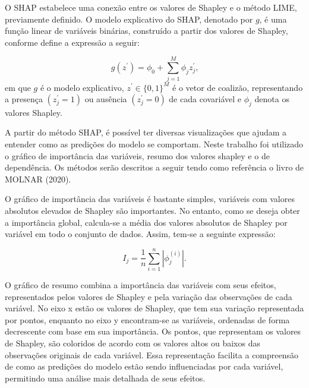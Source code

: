 \documentclass[
  12pt,
  a4paper,
]{scrreprt}
\begin{document}
\vspace{12pt}

O SHAP estabelece uma conexão entre os valores de Shapley e o método
LIME, previamente definido. O modelo explicativo do SHAP, denotado por
\(g\), é uma função linear de variáveis binárias, construído a partir
dos valores de Shapley, conforme define a expressão a seguir:

\[
g\left(z^{'}\right) = \phi_0 + \sum_{j = 1}^{M} \phi_{j} z_{j}^{'}\text{,}
\] em que \(g\) é o modelo explicativo, \(z^{'} \in \{0, 1\}^{M}\) é o
vetor de coalizão, representando a presença \(\left(z^{'}_j = 1\right)\)
ou ausência \(\left(z^{'}_j = 0\right)\) de cada covariável e \(\phi_j\)
denota os valores Shapley.

\vspace{12pt}

A partir do método SHAP, é possível ter diversas visualizações que
ajudam a entender como as predições do modelo se comportam. Neste
trabalho foi utilizado o gráfico de importância das variáveis, resumo
dos valores shapley e o de dependência. Os métodos serão descritos a
seguir tendo como referência o livro de MOLNAR (2020).

\vspace{12pt}

O gráfico de importância das variáveis é bastante simples, variáveis com
valores absolutos elevados de Shapley são importantes. No entanto, como
se deseja obter a importância global, calcula-se a média dos valores
absolutos de Shapley por variável em todo o conjunto de dados. Assim,
tem-se a seguinte expressão:

\[
I_j = \frac{1}{n}\sum^{n}_{i = 1} |\phi_j^{\left(i\right)}|\text{.}
\]

O gráfico de resumo combina a importância das variáveis com seus
efeitos, representados pelos valores de Shapley e pela variação das
observações de cada variável. No eixo x estão os valores de Shapley, que
tem sua variação representada por pontos, enquanto no eixo y
encontram-se as variáveis, ordenadas de forma decrescente com base em
sua importância. Os pontos, que representam os valores de Shapley, são
coloridos de acordo com os valores altos ou baixos das observações
originais de cada variável. Essa representação facilita a compreensão de
como as predições do modelo estão sendo influenciadas por cada variável,
permitindo uma análise mais detalhada de seus efeitos.

\vspace{12pt}
\end{document}
